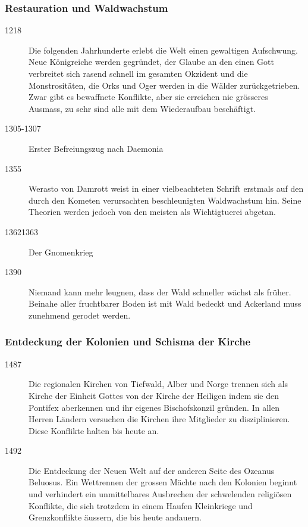 \documentclass[10pt,twoside,twocolumn,openany]{book}
\begin{document}
	\subsubsection{Restauration und Waldwachstum}
	\begin{description}
		\item[1218] Die folgenden Jahrhunderte erlebt die Welt einen gewaltigen Aufschwung. Neue Königreiche werden gegründet, der Glaube an den einen Gott verbreitet sich rasend schnell im gesamten Okzident und die Monstrositäten, die Orks und Oger werden in die Wälder zurückgetrieben. Zwar gibt es bewaffnete Konflikte, aber sie erreichen nie grösseres Ausmass, zu sehr sind alle mit dem Wiederaufbau beschäftigt.
		\item[1305-1307] Erster Befreiungszug nach Daemonia
		\item[1355] Werasto von Damrott weist in einer vielbeachteten Schrift erstmals auf den durch den Kometen verursachten beschleunigten Waldwachstum hin. Seine Theorien werden jedoch von den meisten als Wichtigtuerei abgetan.
		\item[13621363] Der Gnomenkrieg
		\item[1390] Niemand kann mehr leugnen, dass der Wald schneller wächst als früher. Beinahe aller fruchtbarer Boden ist mit Wald bedeckt und Ackerland muss zunehmend gerodet werden.
	\end{description}
	
	\subsubsection{Entdeckung der Kolonien und Schisma der Kirche}
	\begin{description}
		\item[1487] Die regionalen Kirchen von Tiefwald, Alber und Norge trennen sich als Kirche der Einheit Gottes von der Kirche der Heiligen indem sie den Pontifex aberkennen und ihr eigenes Bischofskonzil gründen. In allen Herren Ländern versuchen die Kirchen ihre Mitglieder zu disziplinieren. Diese Konflikte halten bis heute an.
		\item[1492] Die Entdeckung der Neuen Welt auf der anderen Seite des Ozeanus Beluosus. Ein Wettrennen der grossen Mächte nach den Kolonien beginnt und verhindert ein unmittelbares Ausbrechen der schwelenden religiösen Konflikte, die sich trotzdem in einem Haufen Kleinkriege und Grenzkonflikte äussern, die bis heute andauern.
	\end{description}
\end{document}

